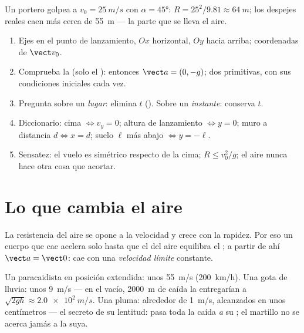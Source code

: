 \begin{example}\label{ex:g12:projectile-motion:kick}
Un portero golpea a $v_0 = \qty{25}{m/s}$ con $\alpha = \ang{45}$:
$R = 25^2/9.81 \approx \qty{64}{m}$; los despejes reales caen más cerca de
\qty{55}{m} --- la parte que se lleva el aire.
\end{example}

\begin{method}\label{met:g12:projectile-motion:method}
\begin{enumerate}
  \item Ejes en el punto de lanzamiento, $Ox$ horizontal, $Oy$ hacia arriba;
        coordenadas de $\vect v_0$.
  \item Comprueba la  (solo el ): entonces $\vect a = (0,-g)$; dos
        primitivas, con sus condiciones iniciales cada vez.
  \item Pregunta sobre un \emph{lugar}: elimina $t$ (). Sobre un
        \emph{instante}: conserva $t$.
  \item Diccionario: cima $\Leftrightarrow v_y = 0$; altura de lanzamiento
        $\Leftrightarrow y = 0$; muro a distancia $d \Leftrightarrow x = d$; suelo
        $\ell$ más abajo $\Leftrightarrow y = -\ell$.
  \item Sensatez: el vuelo es simétrico respecto de la cima; $R \leq v_0^2/g$; el aire
        nunca hace otra cosa que acortar.
\end{enumerate}
\end{method}

\section{Lo que cambia el aire}

\begin{definition}\label{def:g12:projectile-motion:terminal}
La resistencia del aire se opone a la velocidad y crece con la rapidez. Por eso un
cuerpo que cae acelera solo hasta que el  del aire equilibra el ; a
partir de ahí $\vect a = \vect 0$: cae con una \emph{velocidad límite}%
 constante.
\end{definition}

\begin{example}\label{ex:g12:projectile-motion:airorders}
Un paracaidista en posición extendida: unos \qty{55}{m/s} (\qty{200}{km/h}). Una gota
de lluvia: unos \qty{9}{m/s} --- en el vacío, \qty{2000}{m} de caída la entregarían a
$\sqrt{2gh} \approx \qty{2.0e2}{m/s}$. Una pluma: alrededor de \qty{1}{m/s},
alcanzados en unos centímetros --- el secreto de su lentitud: pasa toda la caída
\emph{a} su ; el martillo no se acerca jamás a la suya.
\end{example}

